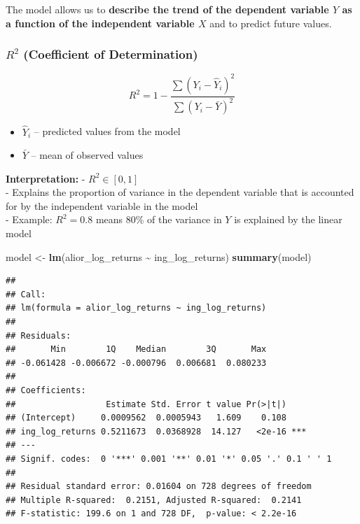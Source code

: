 \documentclass[
]{article}
\newenvironment{Shaded}{\begin{snugshade}}{\end{snugshade}}
\newcommand{\FunctionTok}[1]{\textcolor[rgb]{0.13,0.29,0.53}{\textbf{#1}}}
\newcommand{\NormalTok}[1]{#1}
\newcommand{\OtherTok}[1]{\textcolor[rgb]{0.56,0.35,0.01}{#1}}
\newcommand{\SpecialCharTok}[1]{\textcolor[rgb]{0.81,0.36,0.00}{\textbf{#1}}}
\providecommand{\tightlist}{%
  \setlength{\itemsep}{0pt}\setlength{\parskip}{0pt}}
\begin{document}
The model allows us to \textbf{describe the trend of the dependent
variable \(Y\) as a function of the independent variable \(X\)} and to
predict future values.

\subsubsection{\texorpdfstring{\(R^2\) (Coefficient of
Determination)}{R\^{}2 (Coefficient of Determination)}}\label{r2-coefficient-of-determination}

\[
R^2 = 1 - \frac{\sum (Y_i - \hat{Y}_i)^2}{\sum (Y_i - \bar{Y})^2}
\]

\begin{itemize}
\tightlist
\item
  \(\hat{Y}_i\) -- predicted values from the model\\
\item
  \(\bar{Y}\) -- mean of observed values
\end{itemize}

\textbf{Interpretation:} - \(R^2 \in [0,1]\)\\
- Explains the proportion of variance in the dependent variable that is
accounted for by the independent variable in the model\\
- Example: \(R^2 = 0.8\) means 80\% of the variance in \(Y\) is
explained by the linear model

\begin{Shaded}
\begin{Highlighting}[]
\NormalTok{model }\OtherTok{\textless{}{-}} \FunctionTok{lm}\NormalTok{(alior\_log\_returns }\SpecialCharTok{\textasciitilde{}}\NormalTok{ ing\_log\_returns)}
\FunctionTok{summary}\NormalTok{(model)}
\end{Highlighting}
\end{Shaded}

\begin{verbatim}
## 
## Call:
## lm(formula = alior_log_returns ~ ing_log_returns)
## 
## Residuals:
##       Min        1Q    Median        3Q       Max 
## -0.061428 -0.006672 -0.000796  0.006681  0.080233 
## 
## Coefficients:
##                  Estimate Std. Error t value Pr(>|t|)    
## (Intercept)     0.0009562  0.0005943   1.609    0.108    
## ing_log_returns 0.5211673  0.0368928  14.127   <2e-16 ***
## ---
## Signif. codes:  0 '***' 0.001 '**' 0.01 '*' 0.05 '.' 0.1 ' ' 1
## 
## Residual standard error: 0.01604 on 728 degrees of freedom
## Multiple R-squared:  0.2151, Adjusted R-squared:  0.2141 
## F-statistic: 199.6 on 1 and 728 DF,  p-value: < 2.2e-16
\end{verbatim}
\end{document}
